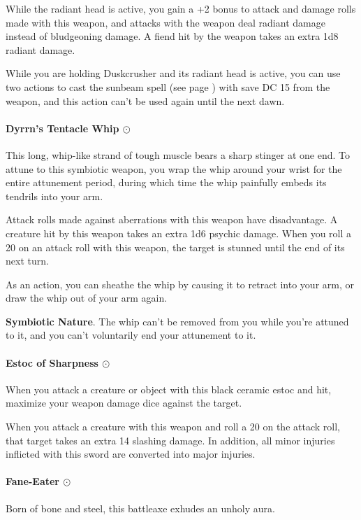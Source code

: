         While the radiant head is active, you gain a +2 bonus to attack and damage rolls made with this weapon, and attacks with the weapon deal radiant damage instead of bludgeoning damage.
        A fiend hit by the weapon takes an extra 1d8 radiant damage.

        While you are holding Duskcrusher and its radiant head is active, you can use two actions to cast the sunbeam spell (see page \pageref{spell::sunbeam}) with save DC 15 from the weapon, and this action can't be used again until the next dawn.
    \paragraph{Dyrrn's Tentacle Whip $\odot$}
        This long, whip-like strand of tough muscle bears a sharp stinger at one end.
        To attune to this symbiotic weapon, you wrap the whip around your wrist for the entire attunement period, during which time the whip painfully embeds its tendrils into your arm.

        Attack rolls made against aberrations with this weapon have disadvantage.
        A creature hit by this weapon takes an extra 1d6 psychic damage.
        When you roll a 20 on an attack roll with this weapon, the target is stunned until the end of its next turn.

        As an action, you can sheathe the whip by causing it to retract into your arm, or draw the whip out of your arm again.

        \textbf{Symbiotic Nature}.
        The whip can't be removed from you while you're attuned to it, and you can't voluntarily end your attunement to it.
    \paragraph{Estoc of Sharpness $\odot$}
        When you attack a creature or object with this black ceramic estoc and hit, maximize your weapon damage dice against the target.

        When you attack a creature with this weapon and roll a 20 on the attack roll, that target takes an extra 14 slashing damage.
        In addition, all minor injuries inflicted with this sword are converted into major injuries.
    \paragraph{Fane-Eater $\odot$}
        Born of bone and steel, this battleaxe exhudes an unholy aura.

